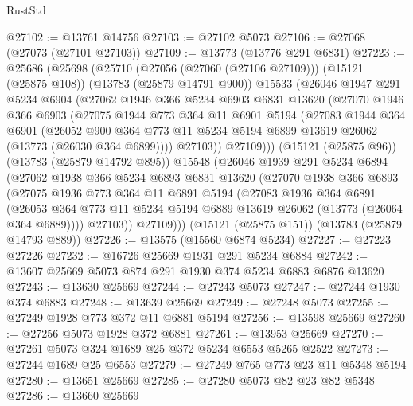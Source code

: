 \begin{lexlean}{RustStd}
\begin{coremodule}
@27102 := @13761 @14756
@27103 := @27102 @5073
@27106 := @27068 (@27073 (@27101 @27103))
@27109 := @13773 (@13776 @291 @6831)
@27223 := @25686
    (@25698
      (@25710
        (@27056 (@27060 (@27106 @27109)))
        (@15121 (@25875 @108))
        (@13783 (@25879 @14791 @900))
        @15533
        (@26046
          @1947
          @291
          @5234
          @6904
          (@27062
            @1946
            @366
            @5234
            @6903
            @6831
            @13620
            (@27070
              @1946
              @366
              @6903
              (@27075
                @1944
                @773
                @364
                @11
                @6901
                @5194
                (@27083
                  @1944
                  @364
                  @6901
                  (@26052
                    @900
                    @364
                    @773
                    @11
                    @5234
                    @5194
                    @6899
                    @13619
                    @26062
                    (@13773 (@26030 @364 @6899))))
                @27103))
            @27109)))
      (@15121 (@25875 @96))
      (@13783 (@25879 @14792 @895))
      @15548
      (@26046
        @1939
        @291
        @5234
        @6894
        (@27062
          @1938
          @366
          @5234
          @6893
          @6831
          @13620
          (@27070
            @1938
            @366
            @6893
            (@27075
              @1936
              @773
              @364
              @11
              @6891
              @5194
              (@27083
                @1936
                @364
                @6891
                (@26053 @364 @773 @11 @5234 @5194 @6889 @13619 @26062 (@13773 (@26064 @364 @6889))))
              @27103))
          @27109)))
    (@15121 (@25875 @151))
    (@13783 (@25879 @14793 @889))
@27226 := @13575 (@15560 @6874 @5234)
@27227 := @27223 @27226
@27232 := @16726 @25669 @1931 @291 @5234 @6884
@27242 := @13607 @25669 @5073 @874 @291 @1930 @374 @5234 @6883 @6876 @13620
@27243 := @13630 @25669
@27244 := @27243 @5073
@27247 := @27244 @1930 @374 @6883
@27248 := @13639 @25669
@27249 := @27248 @5073
@27255 := @27249 @1928 @773 @372 @11 @6881 @5194
@27256 := @13598 @25669
@27260 := @27256 @5073 @1928 @372 @6881
@27261 := @13953 @25669
@27270 := @27261 @5073 @324 @1689 @25 @372 @5234 @6553 @5265 @2522
@27273 := @27244 @1689 @25 @6553
@27279 := @27249 @765 @773 @23 @11 @5348 @5194
@27280 := @13651 @25669
@27285 := @27280 @5073 @82 @23 @82 @5348
@27286 := @13660 @25669

\end{coremodule}
\end{lexlean}

